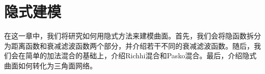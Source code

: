\chapter{隐式建模}

在这一章中，我们将研究如何用隐式方法来建模曲面。首先，我们会将隐函数拆分为距离函数和衰减滤波函数两个部分，并介绍若干不同的衰减滤波函数。随后，我们会在简单的加法混合的基础上，介绍Richhi混合和Pasko混合。最后，介绍隐式曲面如何转化为三角面网络。



